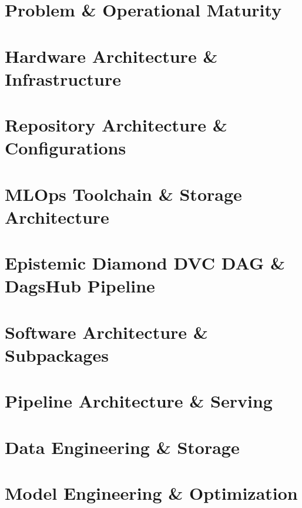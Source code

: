 \documentclass[aspectratio=169]{beamer}
\begin{document}
\section{Problem \& Operational Maturity}


\section{Hardware Architecture \& Infrastructure}


\section{Repository Architecture \& Configurations}


\section{MLOps Toolchain \& Storage Architecture}


\section{Epistemic Diamond DVC DAG \& DagsHub Pipeline}


\section{Software Architecture \& Subpackages}


\section{Pipeline Architecture \& Serving}


\section{Data Engineering \& Storage}


\section{Model Engineering \& Optimization}

\end{document}
